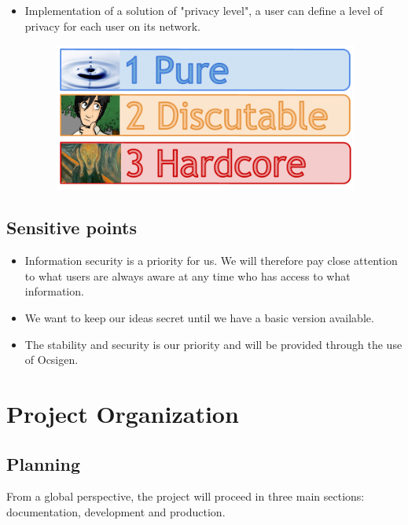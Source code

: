 \documentclass {life-en}
\begin{document}
\begin{itemize}
  \item Implementation of a solution of "privacy level", a user can define a level of privacy for each user on its network. 

\begin{figure} [H]
  \begin{center}
    \includegraphics [width = 10cm]{img/confidentialite.png}
  \end{center}
\end{figure}

\end{itemize}

\section{Sensitive points}

\begin{itemize}
  \item Information security is a priority for us. We will therefore pay close attention to what users are always aware at any time who has access to what information.
  \item We want to keep our ideas secret until we have a basic version available.
  \item The stability and security is our priority and will be provided through the use of Ocsigen.
\end{itemize}


\chapter{Project Organization}

\section{Planning}

From a global perspective, the project will proceed in three main sections: documentation, development and production.\\
\end{document}
